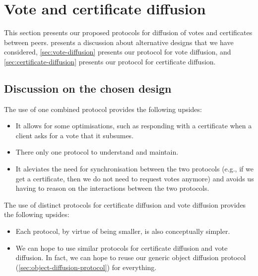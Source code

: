 \section{Vote and certificate diffusion}%
\label{sec:certificate-vote-diffusion}

This section presents our proposed protocols for diffusion of votes and certificates between peers.
 presents a discussion about alternative designs that we have considered, \cref{sec:vote-diffusion} presents our protocol for vote diffusion, and \cref{sec:certificate-diffusion} presents our protocol for certificate diffusion.

\subsection{Discussion on the chosen design}%
\label{sec:cert-vote-diff-discussion}


The use of one combined protocol provides the following upsides:
%
\begin{itemize}
\item
  It allows for some optimisations, such as responding with a certificate when a client asks for a vote that it subsumes.

\item
  There only one protocol to understand and maintain.

\item
  It aleviates the need for synchronisation between the two protocols (e.g., if we get a certificate, then we do not need to request votes anymore) and avoids us having to reason on the interactions between the two protocols.
\end{itemize}

The use of distinct protocols for certificate diffusion and vote diffusion provides the following upsides:

\begin{itemize}
\item
  Each protocol, by virtue of being smaller, is also conceptually simpler.

\item
  We can hope to use similar protocols for certificate diffusion and vote diffusion.
  In fact, we can hope to reuse our generic object diffusion protocol (\cref{sec:object-diffusion-protocol}) for everything.
\end{itemize}


